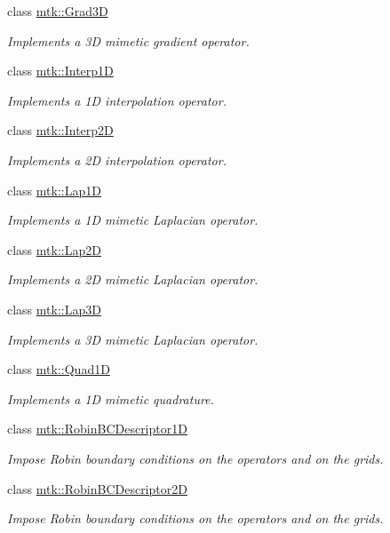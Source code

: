 \begin{DoxyCompactItemize}
class \hyperlink{classmtk_1_1Grad3D}{mtk\+::\+Grad3\+D}
\begin{DoxyCompactList}\small\item\em Implements a 3\+D mimetic gradient operator. \end{DoxyCompactList}\item 
class \hyperlink{classmtk_1_1Interp1D}{mtk\+::\+Interp1\+D}
\begin{DoxyCompactList}\small\item\em Implements a 1\+D interpolation operator. \end{DoxyCompactList}\item 
class \hyperlink{classmtk_1_1Interp2D}{mtk\+::\+Interp2\+D}
\begin{DoxyCompactList}\small\item\em Implements a 2\+D interpolation operator. \end{DoxyCompactList}\item 
class \hyperlink{classmtk_1_1Lap1D}{mtk\+::\+Lap1\+D}
\begin{DoxyCompactList}\small\item\em Implements a 1\+D mimetic Laplacian operator. \end{DoxyCompactList}\item 
class \hyperlink{classmtk_1_1Lap2D}{mtk\+::\+Lap2\+D}
\begin{DoxyCompactList}\small\item\em Implements a 2\+D mimetic Laplacian operator. \end{DoxyCompactList}\item 
class \hyperlink{classmtk_1_1Lap3D}{mtk\+::\+Lap3\+D}
\begin{DoxyCompactList}\small\item\em Implements a 3\+D mimetic Laplacian operator. \end{DoxyCompactList}\item 
class \hyperlink{classmtk_1_1Quad1D}{mtk\+::\+Quad1\+D}
\begin{DoxyCompactList}\small\item\em Implements a 1\+D mimetic quadrature. \end{DoxyCompactList}\item 
class \hyperlink{classmtk_1_1RobinBCDescriptor1D}{mtk\+::\+Robin\+B\+C\+Descriptor1\+D}
\begin{DoxyCompactList}\small\item\em Impose Robin boundary conditions on the operators and on the grids. \end{DoxyCompactList}\item 
class \hyperlink{classmtk_1_1RobinBCDescriptor2D}{mtk\+::\+Robin\+B\+C\+Descriptor2\+D}
\begin{DoxyCompactList}\small\item\em Impose Robin boundary conditions on the operators and on the grids. \end{DoxyCompactList}\end{DoxyCompactItemize}
